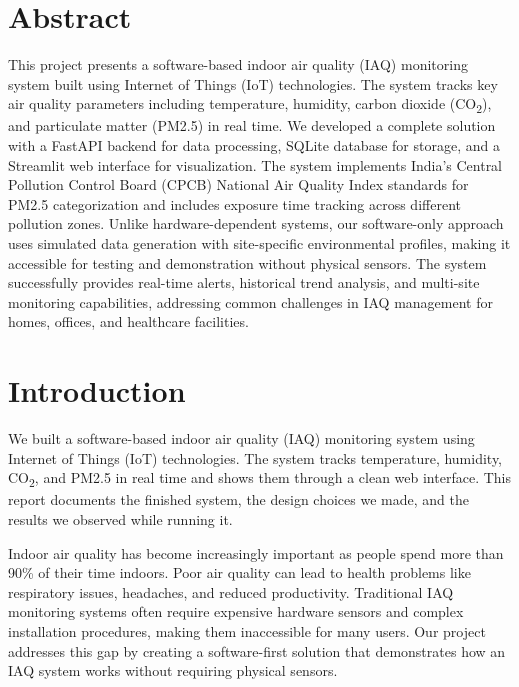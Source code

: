 \documentclass[12pt]{report}
\begin{document}
\tableofcontents
\cleardoublepage
{}

\section*{Abstract}
This project presents a software-based indoor air quality (IAQ) monitoring system built using Internet of Things (IoT) technologies. The system tracks key air quality parameters including temperature, humidity, carbon dioxide (CO\textsubscript{2}), and particulate matter (PM2.5) in real time. We developed a complete solution with a FastAPI backend for data processing, SQLite database for storage, and a Streamlit web interface for visualization. The system implements India's Central Pollution Control Board (CPCB) National Air Quality Index standards for PM2.5 categorization and includes exposure time tracking across different pollution zones. Unlike hardware-dependent systems, our software-only approach uses simulated data generation with site-specific environmental profiles, making it accessible for testing and demonstration without physical sensors. The system successfully provides real-time alerts, historical trend analysis, and multi-site monitoring capabilities, addressing common challenges in IAQ management for homes, offices, and healthcare facilities.

\section{Introduction}
We built a software-based indoor air quality (IAQ) monitoring system using Internet of Things (IoT) technologies. The system tracks temperature, humidity, CO\textsubscript{2}, and PM2.5 in real time and shows them through a clean web interface. This report documents the finished system, the design choices we made, and the results we observed while running it.

Indoor air quality has become increasingly important as people spend more than 90\% of their time indoors. Poor air quality can lead to health problems like respiratory issues, headaches, and reduced productivity. Traditional IAQ monitoring systems often require expensive hardware sensors and complex installation procedures, making them inaccessible for many users. Our project addresses this gap by creating a software-first solution that demonstrates how an IAQ system works without requiring physical sensors.
\end{document}
